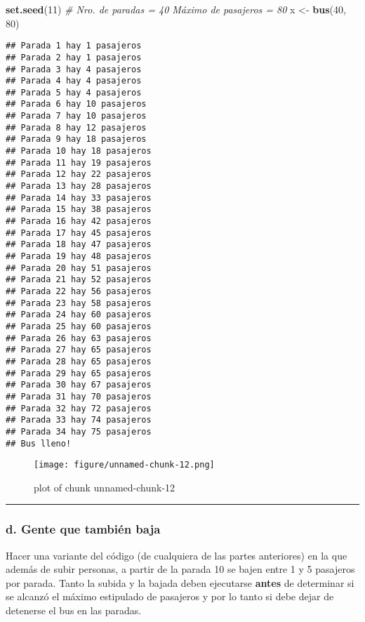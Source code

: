 \documentclass[]{article}
\makeatletter
\newenvironment{Shaded}{}{}
\newcommand{\KeywordTok}[1]{\textcolor[rgb]{0.00,0.44,0.13}{\textbf{{#1}}}}
\newcommand{\DecValTok}[1]{\textcolor[rgb]{0.25,0.63,0.44}{{#1}}}
\newcommand{\CommentTok}[1]{\textcolor[rgb]{0.38,0.63,0.69}{\textit{{#1}}}}
\newcommand{\NormalTok}[1]{{#1}}
\def\maxwidth{\ifdim\Gin@nat@width>\linewidth\linewidth
\else\Gin@nat@width\fi}
\let\Oldincludegraphics\includegraphics
\renewcommand{\includegraphics}[1]{\Oldincludegraphics[width=\maxwidth]{#1}}
\makeatother
\begin{document}
\begin{Shaded}
\begin{Highlighting}[]
\KeywordTok{set.seed}\NormalTok{(}\DecValTok{11}\NormalTok{)}
\CommentTok{# Nro. de paradas = 40 Máximo de pasajeros = 80}
\NormalTok{x <- }\KeywordTok{bus}\NormalTok{(}\DecValTok{40}\NormalTok{, }\DecValTok{80}\NormalTok{)}
\end{Highlighting}
\end{Shaded}
\begin{verbatim}
## Parada 1 hay 1 pasajeros
## Parada 2 hay 1 pasajeros
## Parada 3 hay 4 pasajeros
## Parada 4 hay 4 pasajeros
## Parada 5 hay 4 pasajeros
## Parada 6 hay 10 pasajeros
## Parada 7 hay 10 pasajeros
## Parada 8 hay 12 pasajeros
## Parada 9 hay 18 pasajeros
## Parada 10 hay 18 pasajeros
## Parada 11 hay 19 pasajeros
## Parada 12 hay 22 pasajeros
## Parada 13 hay 28 pasajeros
## Parada 14 hay 33 pasajeros
## Parada 15 hay 38 pasajeros
## Parada 16 hay 42 pasajeros
## Parada 17 hay 45 pasajeros
## Parada 18 hay 47 pasajeros
## Parada 19 hay 48 pasajeros
## Parada 20 hay 51 pasajeros
## Parada 21 hay 52 pasajeros
## Parada 22 hay 56 pasajeros
## Parada 23 hay 58 pasajeros
## Parada 24 hay 60 pasajeros
## Parada 25 hay 60 pasajeros
## Parada 26 hay 63 pasajeros
## Parada 27 hay 65 pasajeros
## Parada 28 hay 65 pasajeros
## Parada 29 hay 65 pasajeros
## Parada 30 hay 67 pasajeros
## Parada 31 hay 70 pasajeros
## Parada 32 hay 72 pasajeros
## Parada 33 hay 74 pasajeros
## Parada 34 hay 75 pasajeros
## Bus lleno!
\end{verbatim}
\begin{figure}[htbp]
\centering
\texttt{[image: figure/unnamed-chunk-12.png]}
\caption{plot of chunk unnamed-chunk-12}
\end{figure}

\begin{center}\rule{3in}{0.4pt}\end{center}

\subsubsection{d. Gente que también baja}

Hacer una variante del código (de cualquiera de las partes anteriores)
en la que además de subir personas, a partir de la parada 10 se bajen
entre 1 y 5 pasajeros por parada. Tanto la subida y la bajada deben
ejecutarse \textbf{antes} de determinar si se alcanzó el máximo
estipulado de pasajeros y por lo tanto si debe dejar de detenerse el bus
en las paradas.
\end{document}
